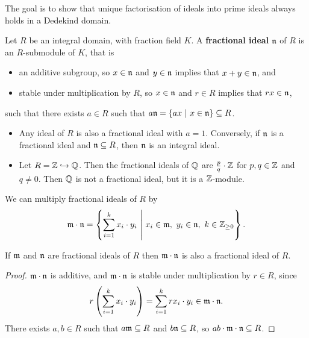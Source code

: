 
The goal is to show that unique factorisation of ideals into prime ideals always holds in a Dedekind domain.

\begin{definition}
Let $ R $ be an integral domain, with fraction field $ K $. A \textbf{fractional ideal} $ \mathfrak{n} $ of $ R $ is an $ R $-submodule of $ K $, that is
\begin{itemize}
\item an additive subgroup, so $ x \in \mathfrak{n} $ and $ y \in \mathfrak{n} $ implies that $ x + y \in \mathfrak{n} $, and
\item stable under multiplication by $ R $, so $ x \in \mathfrak{n} $ and $ r \in R $ implies that $ rx \in \mathfrak{n} $,
\end{itemize}
such that there exists $ a \in R $ such that $ a\nnn = \cbr{ax \st x \in \nnn} \subseteq R $.
\end{definition}

\begin{example*}
\hfill
\begin{itemize}
\item Any ideal of $ R $ is also a fractional ideal with $ a = 1 $. Conversely, if $ \mathfrak{n} $ is a fractional ideal and $ \mathfrak{n} \subseteq R $, then $ \mathfrak{n} $ is an integral ideal.
\item Let $ R = \mathbb{Z} \hookrightarrow \mathbb{Q} $. Then the fractional ideals of $ \mathbb{Q} $ are $ \tfrac{p}{q} \cdot \mathbb{Z} $ for $ p, q \in \mathbb{Z} $ and $ q \ne 0 $. Then $ \mathbb{Q} $ is not a fractional ideal, but it is a $ \mathbb{Z} $-module.
\end{itemize}
\end{example*}

We can multiply fractional ideals of $ R $ by
$$ \mmm \cdot \nnn = \cbr{\sum_{i = 1}^k x_i \cdot y_i \st x_i \in \mmm, \ y_i \in \nnn, \ k \in \ZZ_{\ge 0}}. $$

\begin{lemma}
If $ \mathfrak{m} $ and $ \mathfrak{n} $ are fractional ideals of $ R $ then $ \mathfrak{m} \cdot \mathfrak{n} $ is also a fractional ideal of $ R $.
\end{lemma}

\begin{proof}
$ \mathfrak{m} \cdot \mathfrak{n} $ is additive, and $ \mathfrak{m} \cdot \mathfrak{n} $ is stable under multiplication by $ r \in R $, since
$$ r\br{\sum_{i = 1}^k x_i \cdot y_i} = \sum_{i = 1}^k rx_i \cdot y_i \in \mmm \cdot \nnn. $$
There exists $ a, b \in R $ such that $ a\mathfrak{m} \subseteq R $ and $ b\mathfrak{n} \subseteq R $, so $ ab \cdot \mathfrak{m} \cdot \mathfrak{n} \subseteq R $.
\end{proof}

